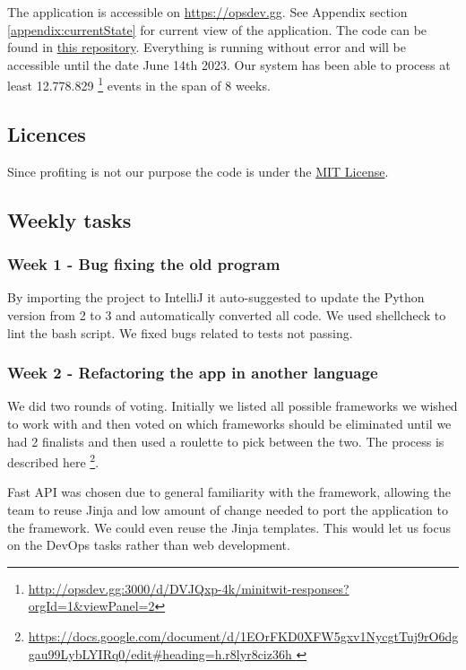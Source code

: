 \documentclass{article}
\begin{document}
The application is accessible on \url{https://opsdev.gg}. See Appendix section  \ref{appendix:currentState} for current view of the application. The code can be found in \href{https://github.com/MinitwitGroupI/MiniTwit}{this repository}. Everything is running without error and will be accessible until the date June 14th 2023.
Our system has been able to process at least 12.778.829 \footnote{\url{http://opsdev.gg:3000/d/DVJQxp-4k/minitwit-responses?orgId=1&viewPanel=2}} events in the span of 8 weeks.

\subsection{Licences}

Since profiting is not our purpose the code is under the \href{https://github.com/MinitwitGroupI/MiniTwit/blob/main/LICENSE}{MIT License}.

\subsection{Weekly tasks}\label{WeeklyTasksSection}


\subsubsection{Week 1 - Bug fixing the old program}

By importing the project to IntelliJ it auto-suggested to update the Python version from 2 to 3 and automatically converted all code. We used shellcheck to lint the bash script. We fixed bugs related to tests not passing.

\subsubsection{Week 2 - Refactoring the app in another language }

We did two rounds of voting. Initially we listed all possible frameworks we wished to work with and then voted on which frameworks should be eliminated until we had 2 finalists and then used a roulette to pick between the two. The process is described here \footnote{\url{https://docs.google.com/document/d/1EOrFKD0XFW5gxv1NycgtTuj9rO6dggau99LybLYIRq0/edit\#heading=h.r8lyr8ciz36h }}. 

Fast API was chosen due to general familiarity with the framework, allowing the team to reuse Jinja and low amount of change needed to port the application to the framework. We could even reuse the Jinja templates. This would let us focus on the DevOps tasks rather than web development. 
\end{document}
